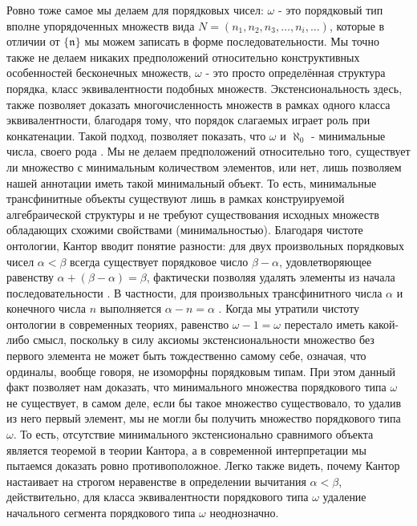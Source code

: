 \documentclass[12pt]{article}
\begin{document}
Ровно тоже самое мы делаем для порядковых чисел: $\omega$ - это порядковый тип вполне упорядоченных множеств вида $N = (n_1, n_2, n_3, \dots, n_i, \dots)$, которые в отличии от $\{ \mathfrak{n} \}$ мы можем записать в форме последовательности. Мы точно также не делаем никаких предположений относительно конструктивных особенностей бесконечных множеств, $\omega$ - это просто определённая структура порядка, класс эквивалентности подобных множеств. Экстенсиональность здесь, также позволяет доказать многочисленность множеств в рамках одного класса эквивалентности, благодаря тому, что порядок слагаемых играет роль при конкатенации. Такой подход, позволяет показать, что $\omega$ и $\aleph_0$ - минимальные числа, своего рода \cite{cantor-omega}. Мы не делаем предположений относительно того, существует ли множество с минимальным количеством элементов, или нет, лишь позволяем нашей аннотации иметь такой минимальный объект. То есть, минимальные трансфинитные объекты существуют лишь в рамках конструируемой алгебраической структуры и не требуют существования исходных множеств обладающих схожими свойствами (минимальностью). Благодаря чистоте онтологии, Кантор вводит понятие разности: для двух произвольных порядковых чисел $\alpha < \beta$ всегда существует порядковое число $\beta - \alpha$, удовлетворяющее равенству $\alpha + (\beta - \alpha) = \beta$, фактически позволяя удалять элементы из начала последовательности \cite{cantor-subtraction}. В частности, для произвольных трансфинитного числа $\alpha$ и конечного числа $n$ выполняется $\alpha - n = \alpha$ \cite{cantor-limit-minus}. Когда мы утратили чистоту онтологии в современных теориях, равенство $\omega - 1 = \omega$ перестало иметь какой-либо смысл, поскольку в силу аксиомы экстенсиональности множество без первого элемента не может быть тождественно самому себе, означая, что ординалы, вообще говоря, не изоморфны порядковым типам. При этом данный факт позволяет нам доказать, что минимального множества порядкового типа $\omega$ не существует, в самом деле, если бы такое множество существовало, то удалив из него первый элемент, мы не могли бы получить множество порядкового типа $\omega$. То есть, отсутствие минимального экстенсионально сравнимого объекта является теоремой в теории Кантора, а в современной интерпретации мы пытаемся доказать ровно противоположное. Легко также видеть, почему Кантор настаивает на строгом неравенстве в определении вычитания $\alpha < \beta$, действительно, для класса эквивалентности порядкового типа $\omega$ удаление начального сегмента порядкового типа $\omega$ неоднозначно.
\end{document}
